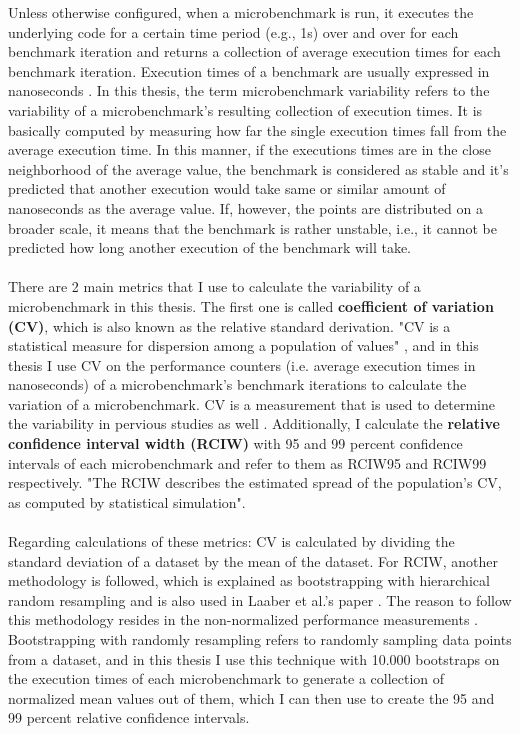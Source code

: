 \documentclass{seal_thesis}
\begin{document}
Unless otherwise configured, when a microbenchmark is run, it executes the underlying code for a certain time period (e.g., 1s) over and over for each benchmark iteration and returns a collection of average execution times for each benchmark iteration\cite{laaber2019software}. Execution times of a benchmark are usually expressed in nanoseconds \cite{laaber2019software} \cite{costa2019}. In this thesis, the term microbenchmark variability refers to the variability of a microbenchmark's resulting collection of execution times. It is basically computed by measuring how far the single execution times fall from the average execution time. In this manner, if the executions times are in the close neighborhood of the average value, the benchmark is considered as stable and it's predicted that another execution would take same or similar amount of nanoseconds as the average value. If, however, the points are distributed on a broader scale, it means that the benchmark is rather unstable, i.e., it cannot be predicted how long another execution of the benchmark will take.\\
\\
There are 2 main metrics that I use to calculate the variability of a microbenchmark in this thesis. The first one is called \textbf{coefficient of variation (CV)}, which is also known as the relative standard derivation\cite{laaber2019software}. "CV is a statistical measure for dispersion among a population of values" \cite{laaber2019software}, and in this thesis I use CV on the performance counters (i.e. average execution times in nanoseconds) of a microbenchmark's benchmark iterations to calculate the variation of a microbenchmark. CV is a measurement that is used to determine the variability in pervious studies as well \cite{laaber2019software} \cite{Leitner:2016:PCS:2926746.2885497}. Additionally, I calculate the \textbf{relative confidence interval width (RCIW)} with 95 and 99 percent confidence intervals of each microbenchmark and refer to them as RCIW95 and RCIW99 respectively. "The RCIW describes the estimated spread of the population's CV, as computed by statistical simulation"\cite{laaber2019software}.\\
\\
Regarding calculations of these metrics: CV is calculated by dividing the standard deviation of a dataset by the mean of the dataset. For RCIW, another methodology is followed, which is explained as bootstrapping with hierarchical random resampling and is also used in Laaber et al.'s paper \cite{laaber2019software}\cite{davison_hinkley_1997}\cite{hierach_data_2010} . The reason to follow this methodology resides in the non-normalized performance measurements \cite{laaber2019software}. Bootstrapping with randomly resampling refers to randomly sampling data points from a dataset, and in this thesis I use this technique with 10.000 bootstraps on the execution times of each microbenchmark to generate a collection of normalized mean values out of them, which I can then use to create the 95 and 99 percent relative confidence intervals.
\end{document}
